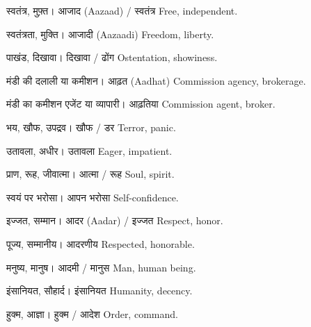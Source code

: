 %
{स्वतंत्र, मुफ़्त।}%
{आजाद (Aazaad) / स्वतंत्र}%
{Free, independent.}

%
{स्वतंत्रता, मुक्ति।}%
{आजादी (Aazaadi)}%
{Freedom, liberty.}

%
{पाखंड, दिखावा।}%
{दिखावा / ढोंग}%
{Ostentation, showiness.}

%
{मंडी की दलाली या कमीशन।}%
{आढ़त (Aadhat)}%
{Commission agency, brokerage.}

%
{मंडी का कमीशन एजेंट या व्यापारी।}%
{आढ़तिया}%
{Commission agent, broker.}

%
{भय, खौफ, उपद्रव।}%
{खौफ / डर}%
{Terror, panic.}

%
{उतावला, अधीर।}%
{उतावला}%
{Eager, impatient.}

%
{प्राण, रूह, जीवात्मा।}%
{आत्मा / रूह}%
{Soul, spirit.}

%
{स्वयं पर भरोसा।}%
{आपन भरोसा}%
{Self-confidence.}

%
{इज्जत, सम्मान।}%
{आदर (Aadar) / इज्जत}%
{Respect, honor.}

%
{पूज्य, सम्मानीय।}%
{आदरणीय}%
{Respected, honorable.}

%
{मनुष्य, मानुष।}%
{आदमी / मानुस}%
{Man, human being.}

%
{इंसानियत, सौहार्द।}%
{इंसानियत}%
{Humanity, decency.}

%
{हुक्म, आज्ञा।}%
{हुक्म / आदेश}%
{Order, command.}

